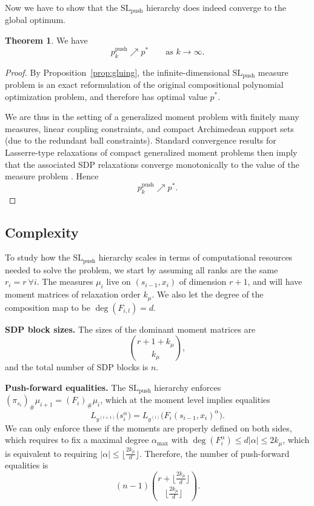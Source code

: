 \documentclass[11pt,a4paper]{article}
\theoremstyle{definition}
\newtheorem{theorem}{Theorem}[section]
\begin{document}
Now we have to show that the $\mathrm{SL}_{\mathrm{push}}$ hierarchy does indeed converge to the global optimum.

\begin{theorem}
We have
\[
p_k^{\mathrm{push}} \nearrow p^*
\qquad \text{as } k\to\infty.
\]
\end{theorem}

\begin{proof}

By Proposition~\ref{prop:gluing}, the infinite-dimensional
$\mathrm{SL}_{\mathrm{push}}$ measure problem is an exact reformulation of the original
compositional polynomial optimization problem, and therefore has optimal value $p^*$.

We are thus in the setting of a generalized moment problem with finitely many measures,
linear coupling constraints, and compact Archimedean support sets (due to the redundant ball constraints). Standard convergence
results for Lasserre-type relaxations of compact generalized moment problems then imply that
the associated SDP relaxations converge monotonically to the value of the measure problem \cite{Lasserre2008GPM}.
Hence
\[
p_k^{\mathrm{push}} \nearrow p^* .
\]
\end{proof}



\subsection{Complexity}

To study how the $\mathrm{SL}_{\mathrm{push}}$ hierarchy scales in terms of computational resources needed to solve the problem, we start by assuming all ranks are the same $r_i=r \ \forall i$. The  measures $\mu_i$ live on $(s_{i-1},x_i)$ of dimension $r+1$, and will have moment matrices of relaxation order $k_{\mu}$. We also let the degree of the composition map to be $\deg(F_{i,l})=d$.

\textbf{SDP block sizes.} The sizes of the dominant moment matrices are
\[
\binom{r+1+k_{\mu}}{k_{\mu}}, 
\]
and the total number of SDP blocks is $n$.

\textbf{Push-forward equalities.} The $\mathrm{SL}_{\mathrm{push}}$ hierarchy enforces $(\pi_{s_{i}})_\#\mu_{i+1} = (F_{i})_{\#}\mu_{i}$, which at the moment level implies equalities
\[
L_{y^{(i+1)}}\!\big(s_{i}^\alpha\big) = L_{y^{(i)}}\!\big(F_i(s_{i-1},x_i)^\alpha\big).
\]
We can only enforce these if the moments are properly defined on both sides, which requires to fix a maximal degree $\alpha_{\max}$ with $\deg(F_i^{\alpha})\leq d|\alpha| \leq 2k_{\mu}$, which is equivalent to requiring $|\alpha|\leq \lfloor \frac{2k_{\mu}}{d}  \rfloor$. Therefore, the number of push-forward equalities is 
\[
(n-1)\binom{r+\lfloor \frac{2k_{\mu}}{d}  \rfloor}{\lfloor \frac{2k_{\mu}}{d}  \rfloor}.
\]
\end{document}
